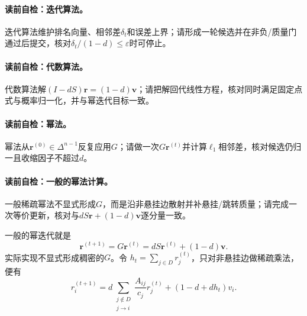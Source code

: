 \paragraph{读前自检：迭代算法。}\PageRank{}迭代算法维护排名向量、相邻差$\delta_t$和误差上界；请形成一轮候选并在非负/质量门通过后提交，核对$\delta_t/(1-d)\le\varepsilon$时可停止。\par
\paragraph{读前自检：代数算法。}\PageRank{}代数算法解$(I-dS)\boldsymbol r=(1-d)\boldsymbol v$；请把解回代线性方程，核对同时满足固定点式与概率归一化，并与幂迭代目标一致。\par
\paragraph{读前自检：幂法。}\PageRank{}幂法从$\boldsymbol r^{(0)}\in\Delta^{n-1}$反复应用$G$；请做一次$G\boldsymbol r^{(t)}$并计算$\ell_1$相邻差，核对候选仍归一且收缩因子不超过$d$。\par
\paragraph{读前自检：一般\PageRank{}的幂法计算。}一般\PageRank{}稀疏幂法不显式形成$G$，而是沿非悬挂边散射并补悬挂/跳转质量；请完成一次等价更新，核对与$dS\boldsymbol r+(1-d)\boldsymbol v$逐分量一致。\par


一般\PageRank{}的幂迭代就是
\begin{equation}
\boldsymbol r^{(t+1)}=G\boldsymbol r^{(t)}
=dS\boldsymbol r^{(t)}+(1-d)\boldsymbol v.
\label{eq:V5-C07-power-update}
\end{equation}
实际实现不显式形成稠密的$G$。令
$h_t=\sum_{j\in D}r_j^{(t)}$，只对非悬挂边做稀疏乘法，便有
\begin{equation}
r_i^{(t+1)}
=d\sum_{\substack{j\notin D\\j\to i}}
\frac{A_{ij}}{c_j}r_j^{(t)}
+(1-d+dh_t)v_i.
\label{eq:V5-C07-sparse-update}
\end{equation}

